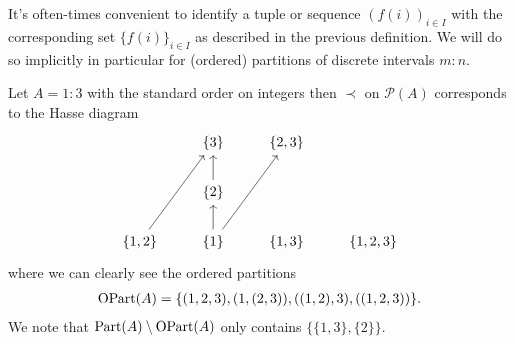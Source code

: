 \begin{remark}
    It's often-times convenient to identify a tuple or sequence $(f(i))_{i \in I}$ with the corresponding set $\{f(i)\}_{i \in I}$ as described in the previous definition. We will do so implicitly in particular for (ordered) partitions of discrete intervals $m:n$.
\end{remark}

\begin{example}
    Let $A = 1:3$ with the standard order on integers then $\prec$ on $\mathcal{P}(A)$ corresponds to the Hasse diagram
    \[\begin{tikzcd}
            & {\{3\}} & {\{2,3\}} \\
            & {\{2\}} \\
            {\{1,2\}} & {\{1\}} & {\{1,3\}} & {\{1,2,3\}}
            \arrow[from=3-2, to=2-2]
            \arrow[from=3-2, to=1-3]
            \arrow[from=2-2, to=1-2]
            \arrow[from=3-1, to=1-2]
        \end{tikzcd}\]
    where we can clearly see the ordered partitions
    \begin{align}
        \operatorname{OPart}(A) = \{
        (1,2,3),
        (1,(2,3)),
        ((1,2),3),
        ((1,2,3))
        \}.
    \end{align}
    We note that $\operatorname{Part}(A) \setminus \operatorname{OPart}(A)$ only contains $\{\{1,3\}, \{2\}\}$.
\end{example}

